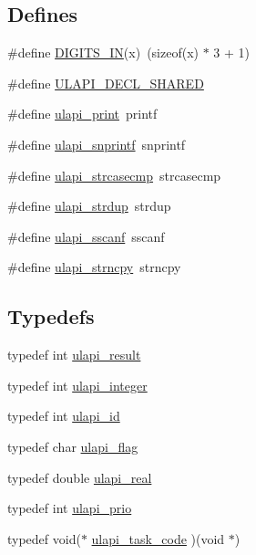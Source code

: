 \subsection*{Defines}
\begin{DoxyCompactItemize}
\item 
\#define \hyperlink{ulapi_8hh_acefcabc33702005f17bbeb236e28047d}{DIGITS\_\-IN}(x)~(sizeof(x) $\ast$ 3 + 1)
\item 
\#define \hyperlink{ulapi_8hh_ada0bcd8eece777daa0fcba77306865a7}{ULAPI\_\-DECL\_\-SHARED}
\item 
\#define \hyperlink{ulapi_8hh_abba15b478b305ca37b608b680a872bc6}{ulapi\_\-print}~printf
\item 
\#define \hyperlink{ulapi_8hh_a5f6eb226869e61317439d63dccdd0805}{ulapi\_\-snprintf}~snprintf
\item 
\#define \hyperlink{ulapi_8hh_af94530ea27322a5b3083869d04c7e7aa}{ulapi\_\-strcasecmp}~strcasecmp
\item 
\#define \hyperlink{ulapi_8hh_ad71a23895ed29d0c5ef2304d232d397b}{ulapi\_\-strdup}~strdup
\item 
\#define \hyperlink{ulapi_8hh_a85a9f4781ed806224740274ad946ce0f}{ulapi\_\-sscanf}~sscanf
\item 
\#define \hyperlink{ulapi_8hh_adc487604c043d615cfa7660bcc2ae50d}{ulapi\_\-strncpy}~strncpy
\end{DoxyCompactItemize}
\subsection*{Typedefs}
\begin{DoxyCompactItemize}
\item 
typedef int \hyperlink{ulapi_8hh_a02d216952303bc6dda8fde2827a2a01f}{ulapi\_\-result}
\item 
typedef int \hyperlink{ulapi_8hh_a110e6b8de916c218a17feafb79167f79}{ulapi\_\-integer}
\item 
typedef int \hyperlink{ulapi_8hh_a382105adb3a098d4ff9dc973b2295555}{ulapi\_\-id}
\item 
typedef char \hyperlink{ulapi_8hh_a0b364c37efe1ff57dd6c085291b67bec}{ulapi\_\-flag}
\item 
typedef double \hyperlink{ulapi_8hh_ac6e0274fd91c3dcd00a8802d6c5cfcb1}{ulapi\_\-real}
\item 
typedef int \hyperlink{ulapi_8hh_ab471b0bc25f71285fe3f8c262cfb8f56}{ulapi\_\-prio}
\item 
typedef void($\ast$ \hyperlink{ulapi_8hh_ac79adb6e96f2644e1d3debb59e6390c8}{ulapi\_\-task\_\-code} )(void $\ast$)
\end{DoxyCompactItemize}
